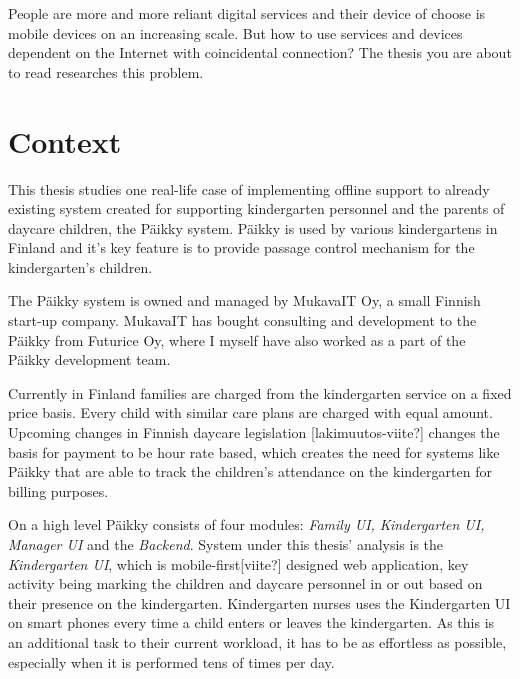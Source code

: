 People are more and more reliant digital services and their device of choose is mobile devices on an increasing scale. But how to use services and devices dependent on the Internet with coincidental connection? The thesis you are about to read researches this problem. 





\section{Context}
This thesis studies one real-life case of implementing offline support to already existing system created for supporting kindergarten personnel and the parents of daycare children, the Päikky system. Päikky is used by various kindergartens in Finland and it's key feature is to provide passage control mechanism for the kindergarten's children.

The Päikky system is owned and managed by MukavaIT Oy, a small Finnish start-up company. MukavaIT has bought consulting and development to the Päikky from Futurice Oy, where I myself have also worked as a part of the Päikky development team.


Currently in Finland families are charged from the kindergarten service on a fixed price basis. Every child with similar care plans are charged with equal amount. Upcoming changes in Finnish daycare legislation [lakimuutos-viite?] changes the basis for payment to be hour rate based, which creates the need for systems like Päikky that are able to track the children's attendance on the kindergarten for billing purposes. 

On a high level Päikky consists of four modules: \textit{Family UI, Kindergarten UI, Manager UI} and the \textit{Backend}. System under this thesis' analysis is the \textit{Kindergarten UI}, which is mobile-first[viite?] designed web application, key activity being marking the children and daycare personnel in or out based on their presence on the kindergarten. Kindergarten nurses uses the Kindergarten UI on smart phones every time a child enters or leaves the kindergarten. As this is an additional task to their current workload, it has to be as effortless as possible, especially when it is performed tens of times per day.




